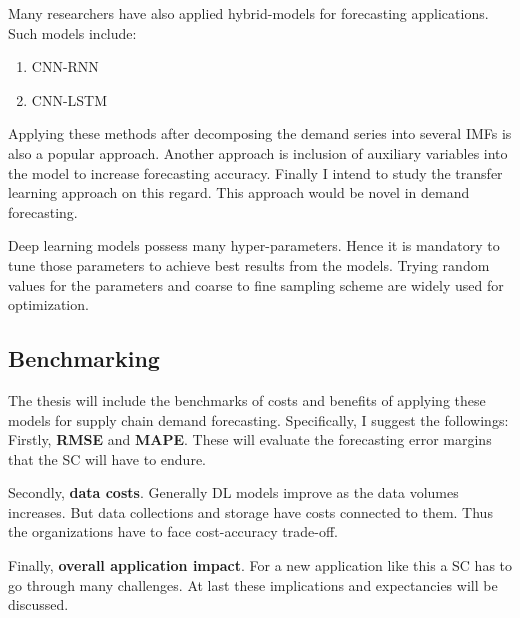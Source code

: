 Many researchers have also applied hybrid-models for forecasting applications. Such models include:
\begin{enumerate}
    \item{CNN-RNN}
    \item{CNN-LSTM}
\end{enumerate}

Applying these methods after decomposing the demand series into several IMFs is also a popular approach. Another approach is inclusion of auxiliary variables into the model to increase forecasting accuracy. Finally I intend to study the transfer learning approach on this regard. This approach would be novel in demand forecasting.

Deep learning models possess many hyper-parameters. Hence it is mandatory to tune those parameters to achieve best results from the models. Trying random values for the parameters and coarse to fine sampling scheme are widely used for optimization. 

\subsection{Benchmarking}
The thesis will include the benchmarks of costs and benefits of applying these models for supply chain demand forecasting. Specifically, I suggest the followings: \\

Firstly, \textbf{RMSE} and \textbf{MAPE}. These will evaluate the forecasting error margins that the SC will have to endure.

Secondly, \textbf{data costs}. Generally DL models improve as the data volumes increases. But data collections and storage have costs connected to them. Thus the organizations have to face cost-accuracy trade-off.

Finally, \textbf{overall application impact}. For a new application like this a SC has to go through many challenges. At last these implications and expectancies will be discussed. 
